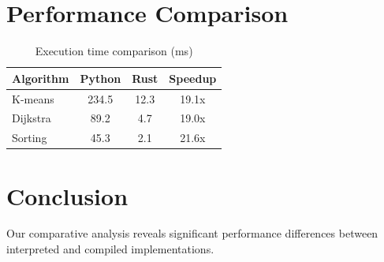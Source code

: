 \documentclass{article}
\begin{document}
\section{Performance Comparison}

\begin{table}[ht]
\centering
\caption{Execution time comparison (ms)}
\label{tab:perf}
\begin{tabular}{lccc}
  \toprule
  Algorithm & Python & Rust & Speedup \\
  \midrule
  K-means & 234.5 & 12.3 & 19.1x \\
  Dijkstra & 89.2 & 4.7 & 19.0x \\
  Sorting & 45.3 & 2.1 & 21.6x \\
  \bottomrule
\end{tabular}
\end{table}

\section{Conclusion}

Our comparative analysis reveals significant performance differences between
interpreted and compiled implementations.



\end{document}
